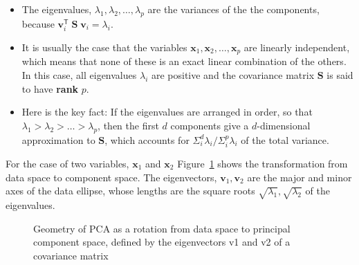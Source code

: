 \documentclass[
  letterpaper,
  10pt,
  krantz2]{krantz}
\begin{document}
{\begin{itemize}
\item
  The eigenvalues, \(\lambda_1, \lambda_2, \dots, \lambda_p\) are the
  variances of the the components, because
  \(\mathbf{v}_i^\textsf{T} \;\mathbf{S} \; \mathbf{v}_i = \lambda_i\).
\item
  It is usually the case that the variables
  \(\mathbf{x}_1, \mathbf{x}_2, \dots, \mathbf{x}_p\) are linearly
  independent, which means that none of these is an exact linear
  combination of the others. In this case, all eigenvalues \(\lambda_i\)
  are positive and the covariance matrix \(\mathbf{S}\) is said to have
  \textbf{rank} \(p\).
\item
  Here is the key fact: If the eigenvalues are arranged in order, so
  that \(\lambda_1 > \lambda_2 > \dots > \lambda_p\), then the first
  \(d\) components give a \(d\)-dimensional approximation to
  \(\mathbf{S}\), which accounts for
  \(\Sigma_i^d \lambda_i / \Sigma_i^p \lambda_i\) of the total variance.
\end{itemize}

For the case of two variables, \(\mathbf{x}_1\) and \(\mathbf{x}_2\)
Figure~\ref{fig-pca-rotation} shows the transformation from data space
to component space. The eigenvectors, \(\mathbf{v}_1, \mathbf{v}_2\) are
the major and minor axes of the data ellipse, whose lengths are the
square roots \(\sqrt{\lambda_1}, \sqrt{\lambda_2}\) of the eigenvalues.

\begin{figure}


\caption{\label{fig-pca-rotation}Geometry of PCA as a rotation from data
space to principal component space, defined by the eigenvectors v1 and
v2 of a covariance matrix}

\end{figure}%

}
\end{document}
